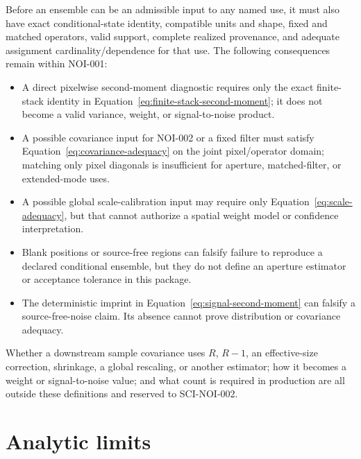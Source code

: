\documentclass[11pt]{article}
\begin{document}
Before an ensemble can be an admissible input to any named use, it must also
have exact conditional-state identity, compatible units and shape, fixed and
matched operators, valid support, complete realized provenance, and adequate
assignment cardinality/dependence for that use.  The following consequences
remain within NOI-001:
\begin{itemize}
\item A direct pixelwise second-moment diagnostic requires only the exact
finite-stack identity in Equation~\eqref{eq:finite-stack-second-moment}; it
does not become a valid variance, weight, or signal-to-noise product.
\item A possible covariance input for NOI-002 or a fixed filter must satisfy
Equation~\eqref{eq:covariance-adequacy} on the joint pixel/operator domain;
matching only pixel diagonals is insufficient for aperture, matched-filter,
or extended-mode uses.
\item A possible global scale-calibration input may require only
Equation~\eqref{eq:scale-adequacy}, but that cannot authorize a spatial weight
model or confidence interpretation.
\item Blank positions or source-free regions can falsify failure to reproduce
a declared conditional ensemble, but they do not define an aperture estimator
or acceptance tolerance in this package.
\item The deterministic imprint in
Equation~\eqref{eq:signal-second-moment} can falsify a source-free-noise claim.
Its absence cannot prove distribution or covariance adequacy.
\end{itemize}

Whether a downstream sample covariance uses $R$, $R-1$, an effective-size
correction, shrinkage, a global rescaling, or another estimator; how it becomes
a weight or signal-to-noise value; and what count is required in production
are all outside these definitions and reserved to SCI-NOI-002.

\section{Analytic limits}
\end{document}
